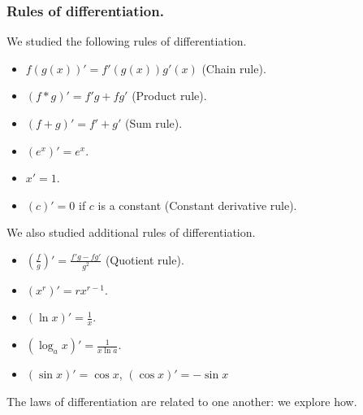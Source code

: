 \begin{frame}
\frametitle{Rules of differentiation.}
We studied the following rules of differentiation.
\begin{itemize}
\item $f (g(x))'=f'(g(x)) g'(x) $ (Chain rule).
\item $(f*g)'=f'g+fg'$ (Product rule).
\item $(f+g)'=f'+g'$ (Sum rule). 
\item $(e^x)'=e^x$.
\item $x'=1$. 
\item $(c)'=0$ if $c$ is a constant (Constant derivative rule).
\end{itemize}
We also studied additional rules of differentiation.
\begin{itemize}
\item $\left(\frac{f}{g}\right)'=\frac{f' g-f g' }{g^2}$ (Quotient rule).
\item $(x^r)'=rx^{r-1} $.
\item $(\ln x)'=\frac{1}x$.
\item $(\log_a x)'=\frac{1}{x\ln a}$.
\item $(\sin x)'=\cos x$, $(\cos x)'=-\sin x$
\end{itemize}
The laws of differentiation are related to one another: we explore how.
\end{frame}
